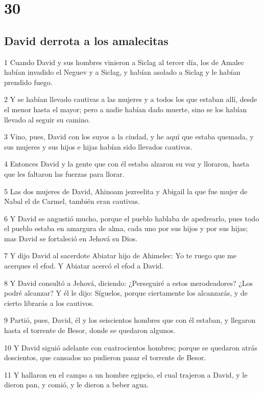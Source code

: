 {\chapter{30}

\section*{David derrota a los amalecitas}

\par 1 Cuando David y sus hombres vinieron a Siclag al tercer día, los de Amalec habían invadido el Neguev y a Siclag, y habían asolado a Siclag y le habían prendido fuego.
\par 2 Y se habían llevado cautivas a las mujeres y a todos los que estaban allí, desde el menor hasta el mayor; pero a nadie habían dado muerte, sino se los habían llevado al seguir su camino.
\par 3 Vino, pues, David con los suyos a la ciudad, y he aquí que estaba quemada, y sus mujeres y sus hijos e hijas habían sido llevados cautivos.
\par 4 Entonces David y la gente que con él estaba alzaron su voz y lloraron, hasta que les faltaron las fuerzas para llorar.
\par 5 Las dos mujeres de David, Ahinoam jezreelita y Abigail la que fue mujer de Nabal el de Carmel, también eran cautivas. 
\par 6 Y David se angustió mucho, porque el pueblo hablaba de apedrearlo, pues todo el pueblo estaba en amargura de alma, cada uno por sus hijos y por sus hijas; mas David se fortaleció en Jehová su Dios.
\par 7 Y dijo David al sacerdote Abiatar hijo de Ahimelec: Yo te ruego que me acerques el efod. Y Abiatar acercó el efod a David.
\par 8 Y David consultó a Jehová, diciendo: ¿Perseguiré a estos merodeadores? ¿Los podré alcanzar? Y él le dijo: Síguelos, porque ciertamente los alcanzarás, y de cierto librarás a los cautivos.
\par 9 Partió, pues, David, él y los seiscientos hombres que con él estaban, y llegaron hasta el torrente de Besor, donde se quedaron algunos.
\par 10 Y David siguió adelante con cuatrocientos hombres; porque se quedaron atrás doscientos, que cansados no pudieron pasar el torrente de Besor.
\par 11 Y hallaron en el campo a un hombre egipcio, el cual trajeron a David, y le dieron pan, y comió, y le dieron a beber agua.
}
